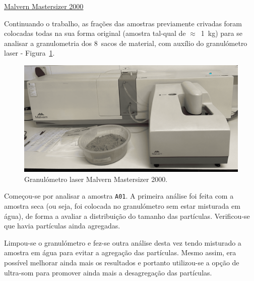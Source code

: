 \hrulefill
\pagebreak


 \href{https://www.malvernpanalytical.com/en/support/product-support/mastersizer-range/mastersizer-2000}{Malvern Mastersizer 2000}


Continuando o trabalho, as frações das amostras previamente crivadas foram colocadas todas na sua forma original (amostra tal-qual de $\approx$~1~kg) para se analisar a granulometria dos 8~sacos de material, com auxílio do granulómetro laser - Figura~\ref{fig:granulometro_laser}.

\begin{figure}[!htb]
    \centering
    \includegraphics[width=0.75\linewidth]{figures/granulometro_laser}
    \caption{Granulómetro laser Malvern Mastersizer 2000.}
    \label{fig:granulometro_laser}
\end{figure}

Começou-se por analisar a amostra \texttt{A01}.
A primeira análise foi feita com a amostra seca (ou seja, foi colocada no granulómetro sem estar misturada em água), de forma a avaliar a distribuição do tamanho das partículas.
Verificou-se que havia partículas ainda agregadas.

Limpou-se o granulómetro e fez-se outra análise desta vez tendo misturado a amostra em água para evitar a agregação das partículas.
Mesmo assim, era possível melhorar ainda mais os resultados e portanto utilizou-se a opção de ultra-som para promover ainda mais a desagregação das partículas.

